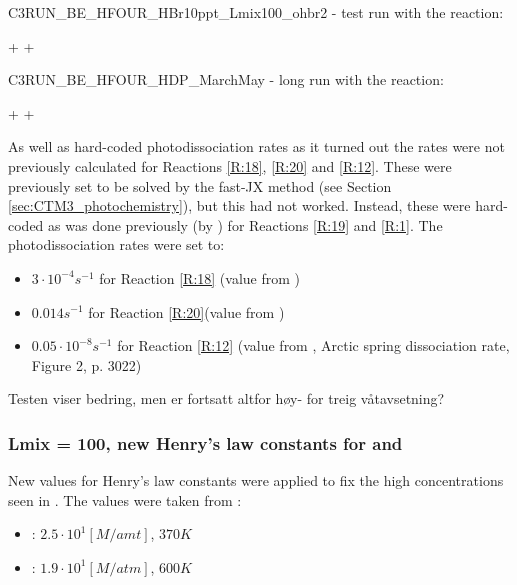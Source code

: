 C3RUN\_BE\_HFOUR\_HBr10ppt\_Lmix100\_ohbr2 - test run with the reaction: 

\begin{reaction}
     +  \rightarrow {} + 
    \label{rqn:oh_br2}
\end{reaction}

C3RUN\_BE\_HFOUR\_HDP\_MarchMay - long run with the reaction: 

\begin{reaction}
     +  \rightarrow {} + 
    \label{rqn:oh_hbr}
\end{reaction}

As well as hard-coded photodissociation rates as it turned out the rates were not previously calculated for Reactions \ref{R:18}, \ref{R:20} and \ref{R:12}. These were previously set to be solved by the fast-JX method (see Section \ref{sec:CTM3_photochemistry}), but this had not worked. Instead, these were hard-coded as was done previously (by \cite{Susanne}) for Reactions \ref{R:19} and \ref{R:1}. The photodissociation rates were set to: 

\begin{itemize}
    \item $3\cdot10^{-4} s^{-1}$ for Reaction \ref{R:18} (value from \cite{CAO})
    \item $0.014 s^{-1}$ for Reaction \ref{R:20}(value from \cite{CAO})
    \item $0.05\cdot10^{-8} s^{-1}$ for Reaction \ref{R:12} (value from \cite{Papanastasiou2013}, Arctic spring dissociation rate, Figure 2, p. 3022)
\end{itemize}


Testen viser bedring, men  er fortsatt altfor høy- for treig våtavsetning? 

\subsubsection{Lmix = 100, new Henry's law constants for  and }\label{sec:new_henrys_law}

New values for Henry's law constants were applied to fix the high concentrations seen in . The values were taken from \cite{dean1999}:

\begin{itemize}
    \item {}: $2.5 \cdot 10^{1} [M/amt]$, $370 K$
    \item {}: $1.9\cdot10^1 [M/atm]$, $600 K$ 
\end{itemize}

